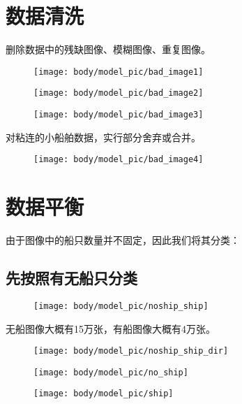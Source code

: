 \section{数据清洗}

删除数据中的残缺图像、模糊图像、重复图像。

\begin{figure}
\centering
\texttt{[image: body/model\_pic/bad\_image1]}
\caption{}
\end{figure}

\begin{figure}
\centering
\texttt{[image: body/model\_pic/bad\_image2]}
\caption{}
\end{figure}

\begin{figure}
\centering
\texttt{[image: body/model\_pic/bad\_image3]}
\caption{}
\end{figure}

对粘连的小船舶数据，实行部分舍弃或合并。

\begin{figure}
\centering
\texttt{[image: body/model\_pic/bad\_image4]}
\caption{}
\end{figure}

\section{数据平衡}

由于图像中的船只数量并不固定，因此我们将其分类：

\subsection{先按照有无船只分类}

\begin{figure}
\centering
\texttt{[image: body/model\_pic/noship\_ship]}
\caption{}
\end{figure}

无船图像大概有15万张，有船图像大概有4万张。

\begin{figure}
\centering
\texttt{[image: body/model\_pic/noship\_ship\_dir]}
\caption{}
\end{figure}

\begin{figure}
\centering
\texttt{[image: body/model\_pic/no\_ship]}
\caption{}
\end{figure}

\begin{figure}
\centering
\texttt{[image: body/model\_pic/ship]}
\caption{}
\end{figure}

